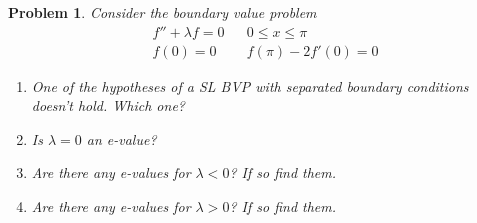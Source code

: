\documentclass[a4paper,12pt]{article} %
\theoremstyle{plain}
\newtheorem{problem}{Problem}
\begin{document}
\begin{problem} %
    Consider the boundary value problem
    \begin{align*}
        &f'' + \lambda f = 0 &  &0 \leq x \leq \pi \\
        &f(0) = 0 && f(\pi) -2f'(0) = 0
    \end{align*}
    
    \begin{enumerate}[label=\alph*.)]
        \item One of the hypotheses of a SL BVP with separated boundary conditions doesn't hold. Which one?
        \item Is $\lambda =0$ an e-value?
        \item Are there any e-values for $\lambda < 0$? If so find them.
        \item Are there any e-values for $\lambda > 0$? If so find them.
    \end{enumerate}
\end{problem}
\end{document}
